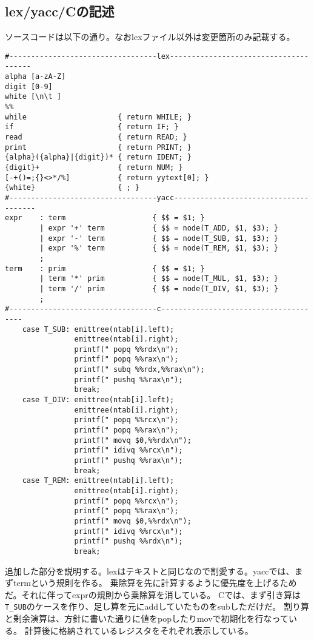 \documentclass[a4paper,11pt]{jarticle}
\begin{document}
\subsection{lex/yacc/Cの記述}
ソースコードは以下の通り。なおlexファイル以外は変更箇所のみ記載する。\\
\begin{verbatim}
#----------------------------------lex--------------------------------------
alpha [a-zA-Z]
digit [0-9]
white [\n\t ]
%%
while                     { return WHILE; }
if                        { return IF; }
read                      { return READ; }
print                     { return PRINT; }
{alpha}({alpha}|{digit})* { return IDENT; }
{digit}+                  { return NUM; }
[-+()=;{}<>*/%]           { return yytext[0]; }
{white}                   { ; }
#----------------------------------yacc--------------------------------------
expr    : term                    { $$ = $1; }
        | expr '+' term           { $$ = node(T_ADD, $1, $3); }
        | expr '-' term           { $$ = node(T_SUB, $1, $3); }
        | expr '%' term           { $$ = node(T_REM, $1, $3); }
        ;
term    : prim                    { $$ = $1; }
        | term '*' prim           { $$ = node(T_MUL, $1, $3); }
        | term '/' prim           { $$ = node(T_DIV, $1, $3); }
        ;
#----------------------------------c--------------------------------------
    case T_SUB: emittree(ntab[i].left);
                emittree(ntab[i].right);
                printf(" popq %%rdx\n");
                printf(" popq %%rax\n");
                printf(" subq %%rdx,%%rax\n");
                printf(" pushq %%rax\n");
                break;
    case T_DIV: emittree(ntab[i].left);
                emittree(ntab[i].right);
                printf(" popq %%rcx\n");
                printf(" popq %%rax\n");
                printf(" movq $0,%%rdx\n");
                printf(" idivq %%rcx\n");
                printf(" pushq %%rax\n");
                break;
    case T_REM: emittree(ntab[i].left);
                emittree(ntab[i].right);
                printf(" popq %%rcx\n");
                printf(" popq %%rax\n");
                printf(" movq $0,%%rdx\n");
                printf(" idivq %%rcx\n");
                printf(" pushq %%rdx\n");
                break;
\end{verbatim}
追加した部分を説明する。lexはテキストと同じなので割愛する。yaccでは、まずtermという規則を作る。
乗除算を先に計算するように優先度を上げるためだ。それに伴ってexprの規則から乗除算を消している。
Cでは、まず引き算は\verb|T_SUB|のケースを作り、足し算を元にaddしていたものをsubしただけだ。
割り算と剰余演算は、方針に書いた通りに値をpopしたりmovで初期化を行なっている。
計算後に格納されているレジスタをそれぞれ表示している。\\
\end{document}
